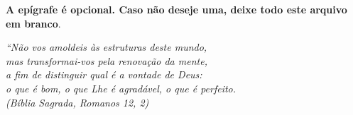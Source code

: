
\begin{epigrafe}
    \vspace*{\fill}
	\begin{flushright}
		\textbf{A epígrafe é opcional. Caso não deseje uma, deixe todo
		este arquivo em branco}.

		\textit{``Não vos amoldeis às estruturas deste mundo, \\
		mas transformai-vos pela renovação da mente, \\
		a fim de distinguir qual é a vontade de Deus: \\
		o que é bom, o que Lhe é agradável, o que é perfeito.\\
		(Bíblia Sagrada, Romanos 12, 2)}
	\end{flushright}
\end{epigrafe}
